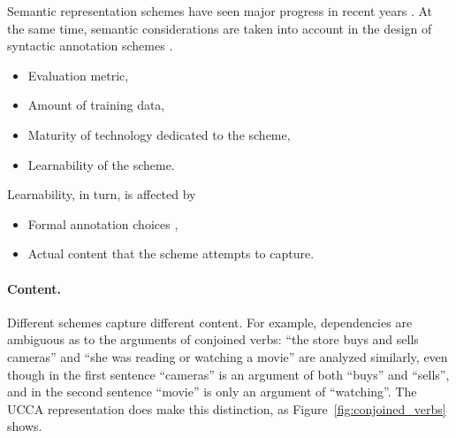 \documentclass[11pt,a4paper]{article}
\begin{document}
  Semantic representation schemes have seen major progress in recent years \cite{abend2017state}.
  At the same time, semantic considerations are taken into account in the design of syntactic annotation schemes
  \cite{przepiorkowski2018arguments}.


  \begin{itemize}
    \item Evaluation metric,
    \item Amount of training data,
    \item Maturity of technology dedicated to the scheme,
    \item Learnability of the scheme.
  \end{itemize}


  Learnability, in turn, is affected by

  \begin{itemize}
    \item Formal annotation choices \cite{Schwartz:12},
    \item Actual content that the scheme attempts to capture.
  \end{itemize}


\paragraph{Content.}

Different schemes capture different content.
For example, dependencies are ambiguous as to the arguments of conjoined verbs:
``the store buys and sells cameras'' and ``she was reading or watching a movie''
are analyzed similarly, even though in the first sentence ``cameras'' is an argument
of both ``buys'' and ``sells'', and in the second sentence ``movie'' is only an argument
of ``watching''.
The UCCA representation does make this distinction, as Figure~\ref{fig:conjoined_verbs} shows.
\end{document}
